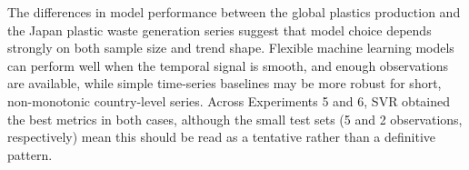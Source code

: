 The differences in model performance between the global plastics production and the Japan plastic waste generation series suggest that model choice depends strongly on both sample size and trend shape. Flexible machine learning models can perform well when the temporal signal is smooth, and enough observations are available, while simple time-series baselines may be more robust for short, non-monotonic country-level series. Across Experiments 5 and 6, SVR obtained the best metrics in both cases, although the small test sets (5 and 2 observations, respectively) mean this should be read as a tentative rather than a definitive pattern.

